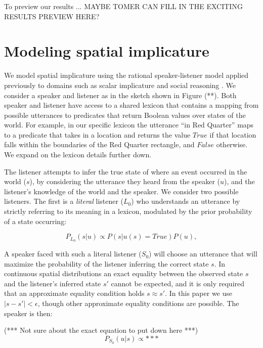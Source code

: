 \documentclass[10pt,letterpaper]{article}
\begin{document}
To preview our results ... MAYBE TOMER CAN FILL IN THE EXCITING RESULTS PREVIEW HERE?

\section{Modeling spatial implicature}\label{mod}

We model spatial implicature using the rational speaker-listener model applied previously to domains such as scalar implicature and social reasoning \cite{ndg+ast:topics2013,ast+ndg:cogsys2013}. We consider a speaker and listener as in the sketch shown in Figure (**). Both speaker and listener have access to a shared lexicon that contains a mapping from possible utterances to predicates that return Boolean values over states of the world. For example, in our specific lexicon the utterance ``in Red Quarter'' maps to a predicate that takes in a location  and returns the value $True$ if that location falls within the boundaries of the Red Quarter rectangle, and $False$ otherwise. We expand on the lexicon details further down. 

The listener attempts to infer the true state of where an event occurred in the world ($s$), by considering the utterance they heard from the speaker ($u$), and the listener's knowledge of the world and the speaker. We consider two possible listeners. The first is a \textit{literal} listener ($L_0$) who understands an utterance by strictly referring to its meaning in a lexicon, modulated by the prior probability of a state occurring:

\begin{equation}
P_{L_0}(s|u)\propto P(s|u(s)=True)P(u),
\end{equation}

A speaker faced with such a literal listener ($S_0$) will choose an utterance that will maximize the probability of the listener inferring the correct state $s$. In continuous spatial distributions an exact equality between the observed state $s$ and the listener's inferred state $s'$ cannot be expected, and it is only required that an approximate equality condition holds $s\approx s'$. In this paper we use $|s-s'|<\epsilon$, though other approximate equality conditions are possible. The speaker is then:

(*** Not sure about the exact equation to put down here ***)
\begin{equation}
P_{S_0}(u|s)\propto ***
\end{equation}
\end{document}
